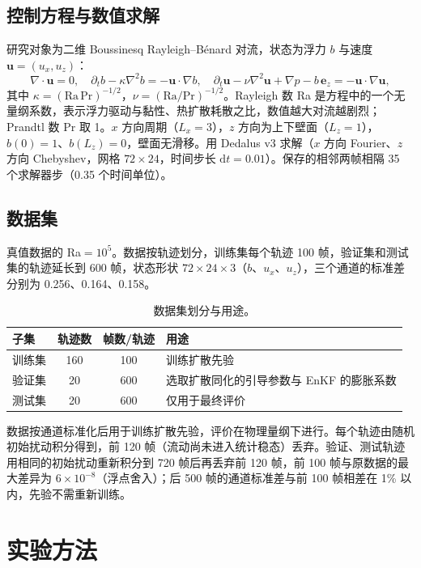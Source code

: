 \documentclass[10.5pt,a4paper]{article}
\begin{document}
\subsection{控制方程与数值求解}
研究对象为二维 Boussinesq Rayleigh--B\'enard 对流，状态为浮力 $b$ 与速度 $\mathbf u=(u_x,u_z)$：
\begin{equation}
\nabla\!\cdot\!\mathbf u=0,\quad \partial_t b-\kappa\nabla^2 b=-\mathbf u\!\cdot\!\nabla b,\quad \partial_t\mathbf u-\nu\nabla^2\mathbf u+\nabla p-b\,\mathbf e_z=-\mathbf u\!\cdot\!\nabla\mathbf u,
\end{equation}
其中 $\kappa=(\mathrm{Ra}\,\mathrm{Pr})^{-1/2}$，$\nu=(\mathrm{Ra}/\mathrm{Pr})^{-1/2}$。Rayleigh 数 Ra 是方程中的一个无量纲系数，表示浮力驱动与黏性、热扩散耗散之比，数值越大对流越剧烈；Prandtl 数 Pr 取 1。$x$ 方向周期（$L_x=3$），$z$ 方向为上下壁面（$L_z=1$），$b(0)=1$、$b(L_z)=0$，壁面无滑移。用 Dedalus v3 求解（$x$ 方向 Fourier、$z$ 方向 Chebyshev，网格 $72\times24$，时间步长 $\mathrm{d}t=0.01$）。保存的相邻两帧相隔 35 个求解器步（0.35 个时间单位）。

\subsection{数据集}
真值数据的 Ra$=10^5$。数据按轨迹划分，训练集每个轨迹 100 帧，验证集和测试集的轨迹延长到 600 帧，状态形状 $72\times24\times3$（$b$、$u_x$、$u_z$），三个通道的标准差分别为 0.256、0.164、0.158。
\begin{table}[H]\centering\small\caption{数据集划分与用途。}
\begin{tabular}{lccp{7.6cm}}\toprule
子集 & 轨迹数 & 帧数/轨迹 & 用途\\\midrule
训练集 & 160 & 100 & 训练扩散先验\\
验证集 & 20 & 600 & 选取扩散同化的引导参数与 EnKF 的膨胀系数\\
测试集 & 20 & 600 & 仅用于最终评价\\\bottomrule
\end{tabular}\end{table}
数据按通道标准化后用于训练扩散先验，评价在物理量纲下进行。每个轨迹由随机初始扰动积分得到，前 120 帧（流动尚未进入统计稳态）丢弃。验证、测试轨迹用相同的初始扰动重新积分到 720 帧后再丢弃前 120 帧，前 100 帧与原数据的最大差异为 $6\times10^{-8}$（浮点舍入）；后 500 帧的通道标准差与前 100 帧相差在 1\% 以内，先验不需重新训练。

\section{实验方法}
\end{document}
